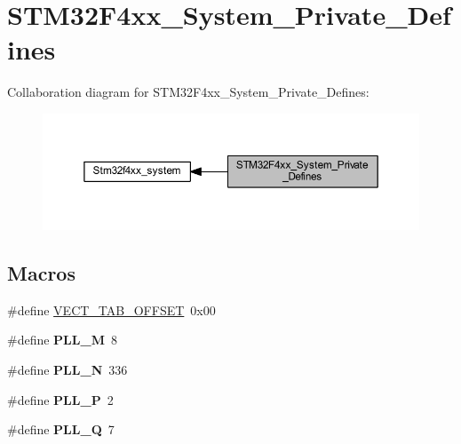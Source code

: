\hypertarget{group___s_t_m32_f4xx___system___private___defines}{}\section{S\+T\+M32\+F4xx\+\_\+\+System\+\_\+\+Private\+\_\+\+Defines}
\label{group___s_t_m32_f4xx___system___private___defines}
Collaboration diagram for S\+T\+M32\+F4xx\+\_\+\+System\+\_\+\+Private\+\_\+\+Defines\+:\nopagebreak
\begin{figure}[H]
\begin{center}
\leavevmode
\includegraphics[width=350pt]{group___s_t_m32_f4xx___system___private___defines}
\end{center}
\end{figure}
\subsection*{Macros}
\begin{DoxyCompactItemize}
\item 
\#define \hyperlink{group___s_t_m32_f4xx___system___private___defines_ga40e1495541cbb4acbe3f1819bd87a9fe}{V\+E\+C\+T\+\_\+\+T\+A\+B\+\_\+\+O\+F\+F\+S\+ET}~0x00
\item 
\mbox{\label{group___s_t_m32_f4xx___system___private___defines_ga0fa5a868f5cd056a04b1c42e454b9617}} 
\#define {\bfseries P\+L\+L\+\_\+M}~8
\item 
\mbox{\label{group___s_t_m32_f4xx___system___private___defines_ga04586ea638d21afe558db4f2798c38a6}} 
\#define {\bfseries P\+L\+L\+\_\+N}~336
\item 
\mbox{\label{group___s_t_m32_f4xx___system___private___defines_ga290dcd27167e925d817e8334111c1c01}} 
\#define {\bfseries P\+L\+L\+\_\+P}~2
\item 
\mbox{\label{group___s_t_m32_f4xx___system___private___defines_gac958257ddb2537c539cffdb3a4543067}} 
\#define {\bfseries P\+L\+L\+\_\+Q}~7
\end{DoxyCompactItemize}


